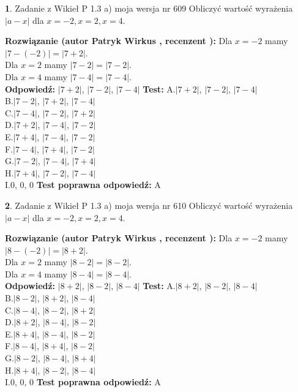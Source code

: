 \documentclass[12pt, a4paper]{article}
\theoremstyle{definition} %
\newtheorem{zad}{}
\newcommand{\zadStart}[1]{\begin{zad}#1\newline}
\newcommand{\zadStop}{\end{zad}}
\newcommand{\rozwStart}[2]{\noindent \textbf{Rozwiązanie (autor #1 , recenzent #2): }\newline}
\newcommand{\rozwStop}{\newline}
\newcommand{\odpStart}{\noindent \textbf{Odpowiedź:}\newline}
\newcommand{\odpStop}{\newline}
\newcommand{\testStart}{\noindent \textbf{Test:}\newline}
\newcommand{\testStop}{\newline}
\newcommand{\kluczStart}{\noindent \textbf{Test poprawna odpowiedź:}\newline}
\newcommand{\kluczStop}{\newline}
\begin{document}
\zadStart{Zadanie z Wikieł P 1.3 a) moja wersja nr 609}
Obliczyć wartość wyrażenia $|a - x|$ dla $x=-2,x=2,x=4$.
\zadStop
\rozwStart{Patryk Wirkus}{}
Dla $x = -2$ mamy $|7 - (-2)| = |7 + 2|$.\\
Dla $x = 2$ mamy $|7 - 2| = |7 - 2|$.\\
Dla $x = 4$ mamy $|7 - 4| = |7 - 4|$.\\
\rozwStop
\odpStart
$|7 + 2|$, $|7 - 2|$, $|7 - 4|$
\odpStop
\testStart
A.$|7 + 2|$, $|7 - 2|$, $|7 - 4|$\\
B.$|7 - 2|$, $|7 + 2|$, $|7 - 4|$\\
C.$|7 - 4|$, $|7 - 2|$, $|7 + 2|$\\
D.$|7 + 2|$, $|7 - 4|$, $|7 - 2|$\\
E.$|7 + 4|$, $|7 - 4|$, $|7 - 2|$\\
F.$|7 - 4|$, $|7 + 4|$, $|7 - 2|$\\
G.$|7 - 2|$, $|7 - 4|$, $|7 + 4|$\\
H.$|7 + 4|$, $|7 - 2|$, $|7 - 4|$\\
I.$0$, $0$, $0$
\testStop
\kluczStart
A
\kluczStop



\zadStart{Zadanie z Wikieł P 1.3 a) moja wersja nr 610}
Obliczyć wartość wyrażenia $|a - x|$ dla $x=-2,x=2,x=4$.
\zadStop
\rozwStart{Patryk Wirkus}{}
Dla $x = -2$ mamy $|8 - (-2)| = |8 + 2|$.\\
Dla $x = 2$ mamy $|8 - 2| = |8 - 2|$.\\
Dla $x = 4$ mamy $|8 - 4| = |8 - 4|$.\\
\rozwStop
\odpStart
$|8 + 2|$, $|8 - 2|$, $|8 - 4|$
\odpStop
\testStart
A.$|8 + 2|$, $|8 - 2|$, $|8 - 4|$\\
B.$|8 - 2|$, $|8 + 2|$, $|8 - 4|$\\
C.$|8 - 4|$, $|8 - 2|$, $|8 + 2|$\\
D.$|8 + 2|$, $|8 - 4|$, $|8 - 2|$\\
E.$|8 + 4|$, $|8 - 4|$, $|8 - 2|$\\
F.$|8 - 4|$, $|8 + 4|$, $|8 - 2|$\\
G.$|8 - 2|$, $|8 - 4|$, $|8 + 4|$\\
H.$|8 + 4|$, $|8 - 2|$, $|8 - 4|$\\
I.$0$, $0$, $0$
\testStop
\kluczStart
A
\kluczStop
\end{document}
